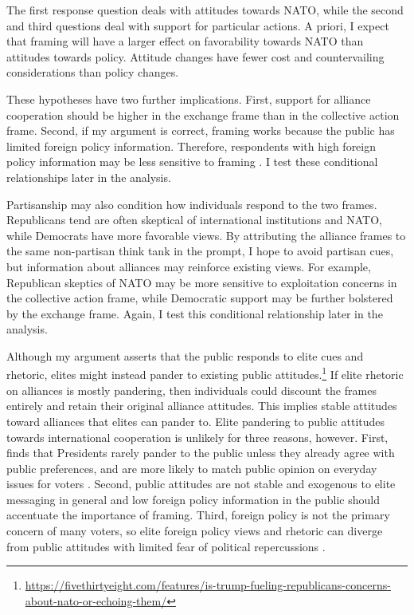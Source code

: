 \documentclass[12pt]{article}
\begin{document}
The first response question deals with attitudes towards NATO, while the second and third questions deal with support for particular actions. 
A priori, I expect that framing will have a larger effect on favorability towards NATO than attitudes towards policy. 
Attitude changes have fewer cost and countervailing considerations than policy changes. 


These hypotheses have two further implications. 
First, support for alliance cooperation should be higher in the exchange frame than in the collective action frame. 
Second, if my argument is correct, framing works because the public has limited foreign policy information. 
Therefore, respondents with high foreign policy information may be less sensitive to framing \citep{Druckman2001}. 
I test these conditional relationships later in the analysis. 


Partisanship may also condition how individuals respond to the two frames. 
Republicans tend are often skeptical of international institutions and NATO, while Democrats have more favorable views.
By attributing the alliance frames to the same non-partisan think tank in the prompt, I hope to avoid partisan cues, but information about alliances may reinforce existing views. 
For example, Republican skeptics of NATO may be more sensitive to exploitation concerns in the collective action frame, while Democratic support may be further bolstered by the exchange frame. 
Again, I test this conditional relationship later in the analysis. 


Although my argument asserts that the public responds to elite cues and rhetoric, elites might instead pander to existing public attitudes.\footnote{\url{https://fivethirtyeight.com/features/is-trump-fueling-republicans-concerns-about-nato-or-echoing-them/}}
If elite rhetoric on alliances is mostly pandering, then individuals could discount the frames entirely and retain their original alliance attitudes.
This implies stable attitudes toward alliances that elites can pander to.  
Elite pandering to public attitudes towards international cooperation is unlikely for three reasons, however. 
First, \citet{Canes-Wrone2006} finds that Presidents rarely pander to the public unless they already agree with public preferences, and are more likely to match public opinion on everyday issues for voters \citep{Canes-WroneSchotts2004}.  
Second, public attitudes are not stable and exogenous to elite messaging in general \citep{Druckman2014} and low foreign policy information in the public should accentuate the importance of framing.
Third, foreign policy is not the primary concern of many voters, so elite foreign policy views and rhetoric can diverge from public attitudes with limited fear of political repercussions \citep{BusbyMonten2012}. 
\end{document}
